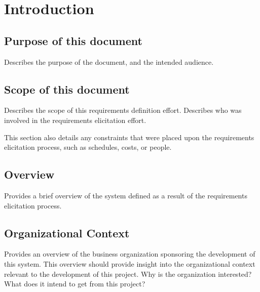 






\section{Introduction}

\subsection{Purpose of this document}
Describes the purpose of the document, and the intended audience.

\subsection{Scope of this document}
Describes the scope of this requirements definition effort. Describes who
was involved in the requirements elicitation effort.

This section also details any constraints that were placed upon the
requirements elicitation process, such as schedules, costs, or people.

\subsection{Overview}
Provides a brief overview of the system defined as a result of the
requirements elicitation process.

\subsection{Organizational Context}
Provides an overview of the business organization sponsoring the
development of this system. This overview should provide insight into the
organizational context relevant to the development of this project. Why is
the organization interested? What does it intend to get from this project?

